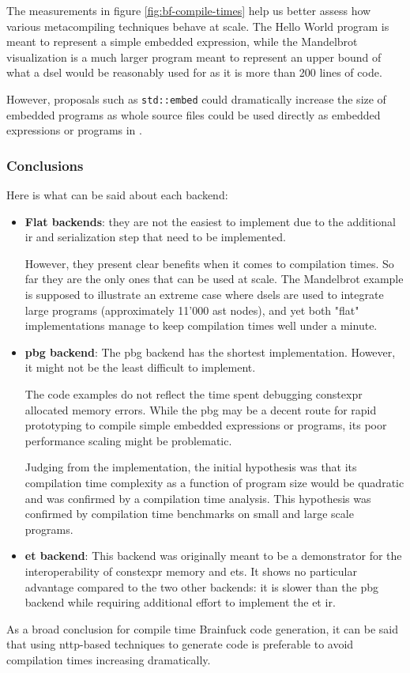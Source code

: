 \documentclass[../main]{subfiles}
\begin{document}
The measurements in figure \ref{fig:bf-compile-times} help us better assess
how various metacompiling techniques behave at scale.
The Hello World program is meant to represent a simple embedded expression,
while the Mandelbrot visualization is a much larger program meant to represent
an upper bound of what a \gls{dsel} would be reasonably used for as it is more
than 200 lines of code.

However, proposals such as \lstinline{std::embed} \cite{stdembed}
could dramatically increase the size of embedded programs as whole source files
could be used directly as embedded expressions or programs in \cpp.

\subsubsection{
  Conclusions
}

Here is what can be said about each backend:

\begin{itemize}

\item
\textbf{Flat backends}:
they are not the easiest to implement due to the additional \gls{ir}
and serialization step that need to be implemented.

However, they present clear benefits when it comes to compilation times.
So far they are the only ones that can be used at scale.
The Mandelbrot example is supposed to illustrate an extreme case where
\glspl{dsel} are used to integrate large programs (approximately 11'000
\gls{ast} nodes), and yet both "flat" implementations manage to keep compilation
times well under a minute.

\item
\textbf{\gls{pbg} backend}:
The \gls{pbg} backend has the shortest implementation.
However, it might not be the least difficult to implement.

The code examples do not reflect the time spent debugging \gls{constexpr}
allocated memory errors. While the \gls{pbg} may be a decent route for
rapid prototyping to compile simple embedded expressions or programs,
its poor performance scaling might be problematic.

Judging from the implementation, the initial hypothesis was that its
compilation time complexity as a function of program size would be quadratic
and was confirmed by a compilation time analysis.
This hypothesis was confirmed by compilation time benchmarks on small
and large scale programs.

\item
\textbf{\gls{et} backend}:
This backend was originally meant to be a demonstrator for the interoperability
of \gls{constexpr} memory and \glspl{et}. It shows no particular advantage
compared to the two other backends: it is slower than the \gls{pbg} backend while
requiring additional effort to implement the \gls{et}
\gls{ir}.

\end{itemize}

As a broad conclusion for compile time Brainfuck code generation,
it can be said that using \gls{nttp}-based techniques to generate code
is preferable to avoid compilation times increasing dramatically.
\end{document}
